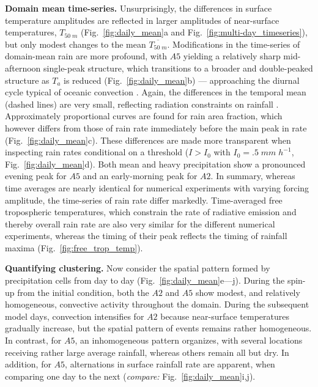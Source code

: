 \documentclass[draft,linenumbers]{agujournal2019}
\begin{document}
\noindent
{\bf Domain mean time-series.}
Unsurprisingly, the differences in surface temperature amplitudes are reflected in larger amplitudes of near-surface temperatures, $T_{50\;m}$ (Fig.~\ref{fig:daily_mean}a and Fig.~\ref{fig:multi-day_timeseries}), but only modest changes to the mean $\overline{T_{50\;m}}$.
Modifications in the time-series of domain-mean rain are more profound, with $A5$ yielding a relatively sharp mid-afternoon single-peak structure, which transitions to a broader and double-peaked structure as $T_a$ is reduced (Fig.~\ref{fig:daily_mean}b) --- approaching the diurnal cycle typical of oceanic convection \cite{yang2001diurnal}.
Again, the differences in the temporal mean (dashed lines) are very small, reflecting radiation constraints on rainfall \cite{held2006robust}.
Approximately proportional curves are found for rain area fraction, which however differs from those of rain rate immediately before the main peak in rate (Fig.~\ref{fig:daily_mean}c).
These differences are made more transparent when inspecting rain rates conditional on a threshold ($I>I_0$ with $I_0=.5\;mm\;h^{-1}$, Fig.~\ref{fig:daily_mean}d). 
Both mean and heavy precipitation show a pronounced evening peak for $A5$ and an early-morning peak for $A2$.
In summary, whereas time averages are nearly identical for numerical experiments with varying forcing amplitude, the time-series of rain rate differ markedly.
Time-averaged free tropospheric temperatures, which constrain the rate of radiative emission and thereby overall rain rate \cite{held2006robust} are also very similar for the different numerical experiments, whereas the timing of their peak reflects the timing of rainfall maxima (Fig.~\ref{fig:free_trop_temp}).

\noindent
{\bf Quantifying clustering.}
Now consider the spatial pattern formed by precipitation cells from day to day (Fig.~\ref{fig:daily_mean}e---j). 
During the spin-up from the initial condition, both the $A2$ and $A5$ show modest, and relatively homogeneous, convective activity throughout the domain. 
During the subsequent model days, convection intensifies for $A2$ because near-surface temperatures gradually increase, but the spatial pattern of events remains rather homogeneous.
In contrast, for $A5$, an inhomogeneous pattern organizes, with several locations receiving rather large average rainfall, whereas others remain all but dry. 
In addition, for $A5$, alternations in surface rainfall rate are apparent, when comparing one day to the next ({\it compare:} Fig.~\ref{fig:daily_mean}i,j).
\end{document}
